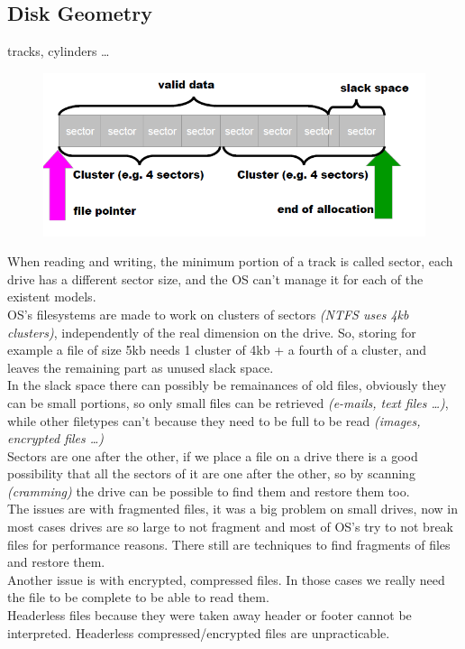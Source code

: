         \subsection{Disk Geometry}
            tracks, cylinders \dots 
            \begin{figure}
                \centering
                \includegraphics[width=0.7\linewidth]{sectors.png}
            \end{figure}
            When reading and writing, the minimum portion of a track is called sector, each drive has a different sector size, and the OS can't manage it for each of the existent models.\\
            OS's filesystems are made to work on clusters of sectors \textit{(NTFS uses 4kb clusters)}, independently of the real dimension on the drive. So, storing for example a file of size 5kb needs 1 cluster of 4kb + a fourth of a cluster, and leaves the remaining part as unused slack space.\\
            In the slack space there can possibly be remainances of old files, obviously they can be small portions, so only small files can be retrieved \textit{(e-mails, text files \dots)}, while other filetypes can't because they need to be full to be read \textit{(images, encrypted files \dots)}\\
            Sectors are one after the other, if we place a file on a drive there is a good possibility that all the sectors of it are one after the other, so by scanning \textit{(cramming)} the drive can be possible to find them and restore them too.\\
            The issues are with fragmented files, it was a big problem on small drives, now in most cases drives are so large to not fragment and most of OS's try to not break files for performance reasons. There still are techniques to find fragments of files and restore them.\\
            Another issue is with encrypted, compressed files. In those cases we really need the file to be complete to be able to read them.\\
            Headerless files because they were taken away header or footer cannot be interpreted. Headerless compressed/encrypted files are unpracticable.
